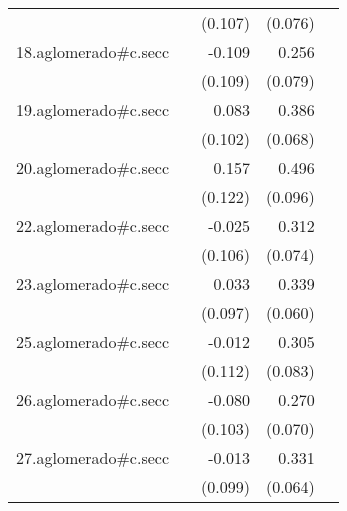 {\begin{longtable}{l*{4}{D{.}{.}{-1}}}
            &                     &     (0.107)         &     (0.076)         &                     \\
\addlinespace
18.aglomerado#c.secc&                     &      -0.109         &       0.256\sym{**} &                     \\
            &                     &     (0.109)         &     (0.079)         &                     \\
\addlinespace
19.aglomerado#c.secc&                     &       0.083         &       0.386\sym{***}&                     \\
            &                     &     (0.102)         &     (0.068)         &                     \\
\addlinespace
20.aglomerado#c.secc&                     &       0.157         &       0.496\sym{***}&                     \\
            &                     &     (0.122)         &     (0.096)         &                     \\
\addlinespace
22.aglomerado#c.secc&                     &      -0.025         &       0.312\sym{***}&                     \\
            &                     &     (0.106)         &     (0.074)         &                     \\
\addlinespace
23.aglomerado#c.secc&                     &       0.033         &       0.339\sym{***}&                     \\
            &                     &     (0.097)         &     (0.060)         &                     \\
\addlinespace
25.aglomerado#c.secc&                     &      -0.012         &       0.305\sym{***}&                     \\
            &                     &     (0.112)         &     (0.083)         &                     \\
\addlinespace
26.aglomerado#c.secc&                     &      -0.080         &       0.270\sym{***}&                     \\
            &                     &     (0.103)         &     (0.070)         &                     \\
\addlinespace
27.aglomerado#c.secc&                     &      -0.013         &       0.331\sym{***}&                     \\
            &                     &     (0.099)         &     (0.064)         &                     \\

\end{longtable}}
